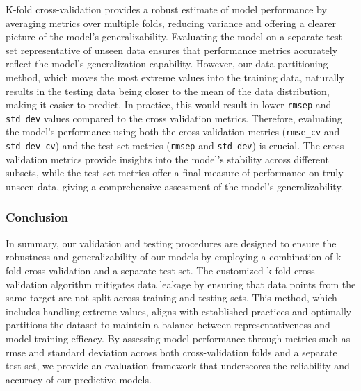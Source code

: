 K-fold cross-validation provides a robust estimate of model performance by averaging metrics over multiple folds, reducing variance and offering a clearer picture of the model's generalizability.
Evaluating the model on a separate test set representative of unseen data ensures that performance metrics accurately reflect the model's generalization capability.
However, our data partitioning method, which moves the most extreme values into the training data, naturally results in the testing data being closer to the mean of the data distribution, making it easier to predict.
In practice, this would result in lower \texttt{rmsep} and \texttt{std\_dev} values compared to the cross validation metrics.
Therefore, evaluating the model's performance using both the cross-validation metrics (\texttt{rmse\_cv} and \texttt{std\_dev\_cv}) and the test set metrics (\texttt{rmsep} and \texttt{std\_dev}) is crucial.
The cross-validation metrics provide insights into the model's stability across different subsets, while the test set metrics offer a final measure of performance on truly unseen data, giving a comprehensive assessment of the model's generalizability.


\subsubsection{Conclusion}
In summary, our validation and testing procedures are designed to ensure the robustness and generalizability of our models by employing a combination of k-fold cross-validation and a separate test set.
The customized k-fold cross-validation algorithm mitigates data leakage by ensuring that data points from the same target are not split across training and testing sets.
This method, which includes handling extreme values, aligns with established practices and optimally partitions the dataset to maintain a balance between representativeness and model training efficacy.
By assessing model performance through metrics such as \gls{rmse} and standard deviation across both cross-validation folds and a separate test set, we provide an evaluation framework that underscores the reliability and accuracy of our predictive models.

